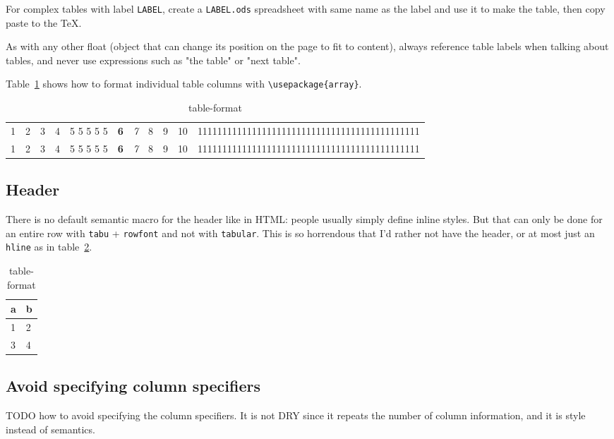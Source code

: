 \documentclass[12pt]{article}
\begin{document}
For complex tables with label \lstinline|LABEL|, create a \lstinline|LABEL.ods| spreadsheet with same name as the label and use it to make the table, then copy paste to the TeX.

As with any other float (object that can change its position on the page to fit to content), always reference table labels when talking about tables, and never use expressions such as "the table" or "next table".

Table~\ref{table-format} shows how to format individual table columns with \lstinline|\usepackage{array}|.

\begin{table}
\begin{tabular}{l c rp{1cm} p{1cm} >{\bf}c >{\it}c | c || c @{abc} c c}
1 & 2 & 3 & 4 & 5 5 5 5 5 & 6 & 7 & 8 & 9 & 10 & 111111111111111111111111111111111111111111111 \\
1 & 2 & 3 & 4 & 5 5 5 5 5 & 6 & 7 & 8 & 9 & 10 & 111111111111111111111111111111111111111111111 \\
\end{tabular}
\caption{table-format}
\label{table-format}
\end{table}

\subsection{Header}\label{table-header}

There is no default semantic macro for the header like in HTML: people usually simply define inline styles. But that can only be done for an entire row with \lstinline|tabu| + \lstinline|rowfont| and not with \lstinline|tabular|. This is so horrendous that I'd rather not have the header, or at most just an \lstinline|hline| as in table~\ref{table-header-hline}.

\begin{table}
\begin{tabular}{ll}
a & b \\
\hline
1 & 2 \\
3 & 4
\end{tabular}
\caption{table-format}
\label{table-header-hline}
\end{table}

\subsection{Avoid specifying column specifiers}\label{table-header}

TODO how to avoid specifying the column specifiers. It is not DRY since it repeats the number of column information, and it is style instead of semantics.
\end{document}
